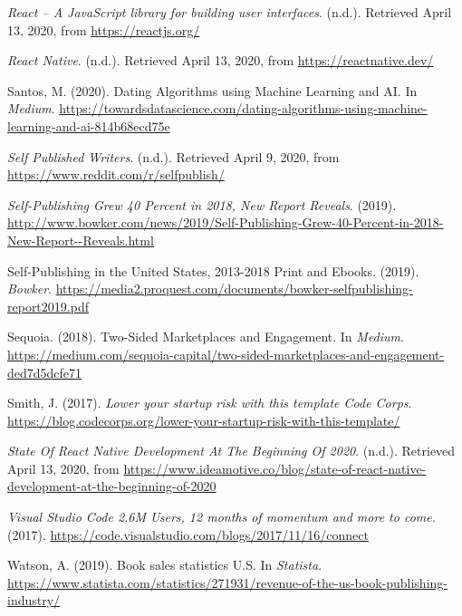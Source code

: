 \documentclass[11pt,openany]{book}
\newlength{\cslhangindent}
\newenvironment{cslreferences}%
  {\setlength{\parindent}{0pt}%
  \everypar{\setlength{\hangindent}{\cslhangindent}}\ignorespaces}%
  {\par}
\begin{document}
\begin{cslreferences}
\leavevmode\hypertarget{ref-ReactJavaScriptLibrary}{}%
\emph{React -- A JavaScript library for building user interfaces}.
(n.d.). Retrieved April 13, 2020, from \url{https://reactjs.org/}

\leavevmode\hypertarget{ref-ReactNativeFramework}{}%
\emph{React Native}. (n.d.). Retrieved April 13, 2020, from
\url{https://reactnative.dev/}

\leavevmode\hypertarget{ref-santos_dating_2020}{}%
Santos, M. (2020). Dating Algorithms using Machine Learning and AI. In
\emph{Medium}.
\url{https://towardsdatascience.com/dating-algorithms-using-machine-learning-and-ai-814b68ecd75e}

\leavevmode\hypertarget{ref-noauthor_self_nodate}{}%
\emph{Self Published Writers}. (n.d.). Retrieved April 9, 2020, from
\url{https://www.reddit.com/r/selfpublish/}

\leavevmode\hypertarget{ref-bowker_news_nodate}{}%
\emph{Self-Publishing Grew 40 Percent in 2018, New Report Reveals}.
(2019).
\url{http://www.bowker.com/news/2019/Self-Publishing-Grew-40-Percent-in-2018-New-Report--Reveals.html}

\leavevmode\hypertarget{ref-bowker_self-publishing_2019}{}%
Self-Publishing in the United States, 2013-2018 Print and Ebooks.
(2019). \emph{Bowker}.
\url{https://media2.proquest.com/documents/bowker-selfpublishing-report2019.pdf}

\leavevmode\hypertarget{ref-sequoia_two-sided_2018}{}%
Sequoia. (2018). Two-Sided Marketplaces and Engagement. In
\emph{Medium}.
\url{https://medium.com/sequoia-capital/two-sided-marketplaces-and-engagement-ded7d5dcfe71}

\leavevmode\hypertarget{ref-smith_lower_nodate}{}%
Smith, J. (2017). \emph{Lower your startup risk with this template Code
Corps}.
\url{https://blog.codecorps.org/lower-your-startup-risk-with-this-template/}

\leavevmode\hypertarget{ref-StateReactNative}{}%
\emph{State Of React Native Development At The Beginning Of 2020}.
(n.d.). Retrieved April 13, 2020, from
\url{https://www.ideamotive.co/blog/state-of-react-native-development-at-the-beginning-of-2020}

\leavevmode\hypertarget{ref-VisualStudioCode}{}%
\emph{Visual Studio Code 2.6M Users, 12 months of momentum and more to
come.} (2017).
\url{https://code.visualstudio.com/blogs/2017/11/16/connect}

\leavevmode\hypertarget{ref-statista_book_2020}{}%
Watson, A. (2019). Book sales statistics U.S. In \emph{Statista}.
\url{https://www.statista.com/statistics/271931/revenue-of-the-us-book-publishing-industry/}
\end{cslreferences}

\end{document}
